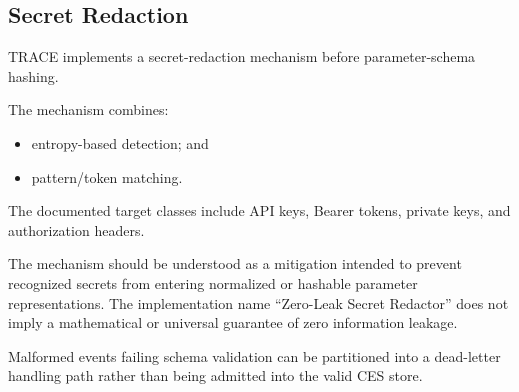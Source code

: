 \documentclass[11pt,a4paper]{article}
\begin{document}
\subsection{Secret Redaction}

TRACE implements a secret-redaction mechanism before parameter-schema hashing.

The mechanism combines:

\begin{itemize}
\item entropy-based detection; and
\item pattern/token matching.
\end{itemize}

The documented target classes include API keys, Bearer tokens, private keys, and
authorization headers.

The mechanism should be understood as a mitigation intended to prevent recognized secrets
from entering normalized or hashable parameter representations. The implementation name
``Zero-Leak Secret Redactor'' does not imply a mathematical or universal guarantee of
zero information leakage.

Malformed events failing schema validation can be partitioned into a dead-letter
handling path rather than being admitted into the valid CES store.
\end{document}
